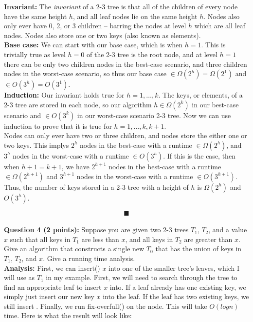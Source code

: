 \documentclass[a4paper,12pt]{article}
\begin{document}
\textbf{Invariant:} The \textit{invariant} of a 2-3 tree is that all of the children of every node have the same height $h$, and all leaf nodes lie on the same height $h$. Nodes also only ever have 0, 2, or 3 children -- barring the nodes at level $h$ which are all leaf nodes. Nodes also store one or two keys (also known as elements).\\

\textbf{Base case:} We can start with our base case, which is when $h=1$. This is trivially true as level $h=0$ of the 2-3 tree is the root node, and at level $h=1$ there can be only two children nodes in the best-case scenario, and three children nodes in the worst-case scenario, so thus our base case $\in \Omega(2^h)=\Omega(2^1)$ and $\in O(3^h)=O(3^1)$.\\ 

\textbf{Induction:} Our invariant holds true for $h = 1, \ldots, k$. The keys, or elements, of a 2-3 tree are stored in each node, so our algorithm $h \in \Omega(2^k)$ in our best-case scenario and $\in O(3^k)$ in our worst-case scenario 2-3 tree. Now we can use induction to prove that it is true for $h = 1,\ldots, k, k+1$.\\

Nodes can only ever have two or three children, and nodes store the either one or two keys. This implys $2^h$ nodes in the best-case with a runtime $\in \Omega(2^h)$, and $3^h$ nodes in the worst-case with a runtime $\in O(3^h)$. If this is the case, then when $h+1=k+1$, we have $2^{h+1}$ nodes in the best-case with a runtime $\in \Omega(2^{h+1})$ and $3^{h+1}$ nodes in the worst-case with a runtime $\in O(3^{h+1})$.\\

Thus, the number of keys stored in a 2-3 tree with a height of $h$ is $\Omega(2^h)$ and $O(3^h)$. 

$$\blacksquare$$\\

\textbf{Question 4 (2 points):} Suppose you are given two 2-3 trees $T_1$, $T_2$, and a value $x$ such that all keys in $T_1$ are less than $x$, and all keys in $T_2$ are greater than $x$. Give an algorithm that constructs a single new $T_0$ that has the union of keys in $T_1$, $T_2$, and $x$. Give a running time analysis.\\

\textbf{Analysis:} First, we can insert() $x$ into one of the smaller tree's leaves, which I will use as $T_1$ in my example. First, we will need to search through the tree to find an appropriate leaf to insert $x$ into. If a leaf already has one existing key, we simply just insert our new key $x$ into the leaf. If the leaf has two existing keys, we still insert . Finally, we run fix-overfull() on the node. This will take $O(logn)$ time. Here is what the result will look like:\\
\end{document}
